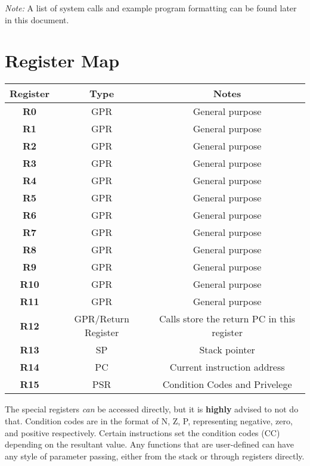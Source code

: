 \documentclass{article}
\begin{document}
\begin{tableofcontents}
\begin{Large}
\textit{Note:} A list of system calls and example program formatting can be found later in this
document.
\end{Large}
\section{\Huge Register Map}
\begin{center}
\begin{tabular}{ |c|c|c| }
\hline
\textbf{Register} & \textbf{Type} & \textbf{Notes} \\
\hline
\textbf{R0} & GPR & General purpose \\
\hline
\textbf{R1} & GPR & General purpose \\
\hline
\textbf{R2} & GPR & General purpose \\
\hline
\textbf{R3} & GPR & General purpose \\
\hline
\textbf{R4} & GPR & General purpose \\
\hline
\textbf{R5} & GPR & General purpose \\
\hline
\textbf{R6} & GPR & General purpose \\
\hline
\textbf{R7} & GPR & General purpose \\
\hline
\textbf{R8} & GPR & General purpose \\
\hline
\textbf{R9} & GPR & General purpose \\
\hline
\textbf{R10} & GPR & General purpose \\
\hline
\textbf{R11} & GPR & General purpose \\
\hline
\textbf{R12} & GPR/Return Register & Calls store the return PC in this register \\
\hline
\textbf{R13} & SP & Stack pointer \\
\hline
\textbf{R14} & PC & Current instruction address \\
\hline
\textbf{R15} & PSR & Condition Codes and Privelege \\
\hline
\end{tabular}
\end{center}
\large The special registers \textit{can} be accessed directly, but it is \textbf{highly} advised
to not do that. Condition codes are in the format of N, Z, P, representing negative, zero, and 
positive respectively. Certain instructions set the condition codes (CC) depending on the 
resultant value. Any functions that are user-defined can have any style of parameter passing,
either from the stack or through registers directly.

\end{tableofcontents}
\end{document}
